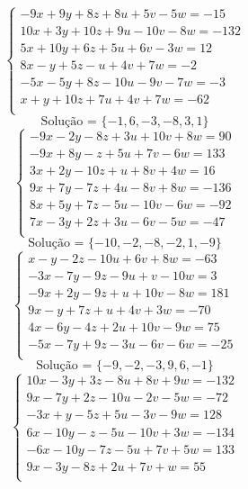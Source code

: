 \documentclass[12pt,oneside,a4paper]{article}
\begin{document}
\vspace{\baselineskip}
\begin{equation*}
\begin{cases}
-9x+9y+8z+8u+5v-5w=-15 \\
10x+3y+10z+9u-10v-8w=-132 \\
5x+10y+6z+5u+6v-3w=12 \\
8x-y+5z-u+4v+7w=-2 \\
-5x-5y+8z-10u-9v-7w=-3 \\
x+y+10z+7u+4v+7w=-62 \\
\end{cases}
\end{equation*}
\begin{equation*}
\text{Solução = }\{-1,6,-3,-8,3,1\}
\end{equation*}
\vspace{\baselineskip}
\begin{equation*}
\begin{cases}
-9x-2y-8z+3u+10v+8w=90 \\
-9x+8y-z+5u+7v-6w=133 \\
3x+2y-10z+u+8v+4w=16 \\
9x+7y-7z+4u-8v+8w=-136 \\
8x+5y+7z-5u-10v-6w=-92 \\
7x-3y+2z+3u-6v-5w=-47 \\
\end{cases}
\end{equation*}
\begin{equation*}
\text{Solução = }\{-10,-2,-8,-2,1,-9\}
\end{equation*}
\vspace{\baselineskip}
\begin{equation*}
\begin{cases}
x-y-2z-10u+6v+8w=-63 \\
-3x-7y-9z-9u+v-10w=3 \\
-9x+2y-9z+u+10v-8w=181 \\
9x-y+7z+u+4v+3w=-70 \\
4x-6y-4z+2u+10v-9w=75 \\
-5x-7y+9z-3u-6v-6w=-25 \\
\end{cases}
\end{equation*}
\begin{equation*}
\text{Solução = }\{-9,-2,-3,9,6,-1\}
\end{equation*}
\vspace{\baselineskip}
\begin{equation*}
\begin{cases}
10x-3y+3z-8u+8v+9w=-132 \\
9x-7y+2z-10u-2v-5w=-72 \\
-3x+y-5z+5u-3v-9w=128 \\
6x-10y-z-5u-10v+3w=-134 \\
-6x-10y-7z-5u+7v+5w=133 \\
9x-3y-8z+2u+7v+w=55 \\
\end{cases}
\end{equation*}
\end{document}
